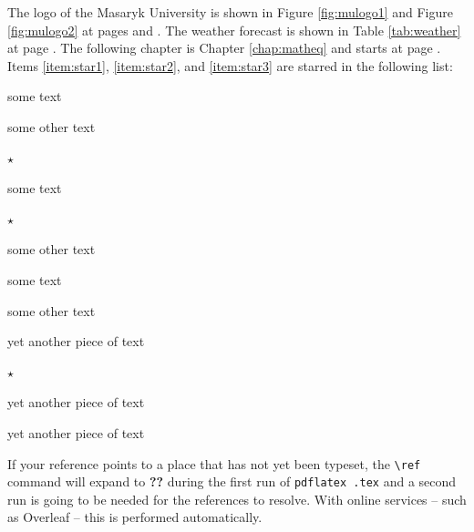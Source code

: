 \documentclass[
  digital, %
  table,   %
  lof,     %
  lot,     %
]{fithesis3}
\begin{document}
The logo of the Masaryk University is shown in Figure
\ref{fig:mulogo1} and Figure \ref{fig:mulogo2} at pages
\pageref{fig:mulogo1} and \pageref{fig:mulogo2}. The weather
forecast is shown in Table \ref{tab:weather} at page
\pageref{tab:weather}. The following chapter is Chapter
\ref{chap:matheq} and starts at page \pageref{chap:matheq}.
Items \ref{item:star1}, \ref{item:star2}, and
\ref{item:star3} are starred in the following list:
\begin{compactenum}
  \item some text
  \item some other text
  \item $\star$ \label{item:star1}
  \begin{compactenum}
    \item some text
    \item $\star$ \label{item:star2}
    \item some other text
    \begin{compactenum}
      \item some text
      \item some other text
      \item yet another piece of text
      \item $\star$ \label{item:star3}
    \end{compactenum}
    \item yet another piece of text
  \end{compactenum}
  \item yet another piece of text
\end{compactenum}
If your reference points to a place that has not yet been typeset,
the \verb"\ref" command will expand to \textbf{??} during the first
run of
\texttt{pdflatex \jobname.tex}
and a second run is going to be needed for the references to
resolve. With online services -- such as Overleaf -- this is
performed automatically.
\end{document}
